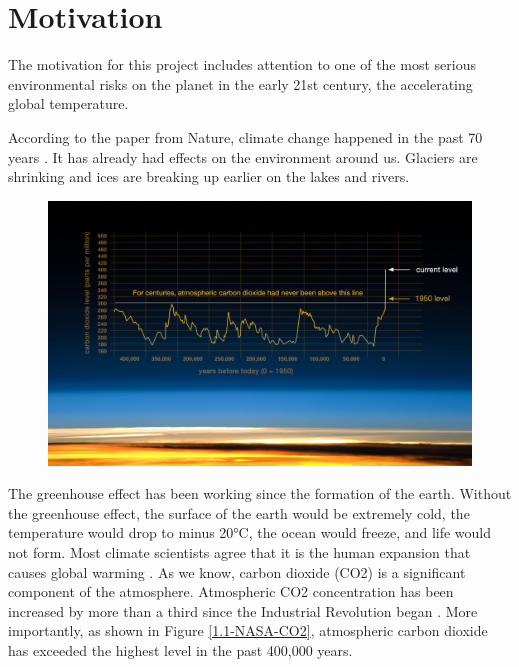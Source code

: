 \section{Motivation} %

The motivation for this project includes attention to one of the most serious environmental risks on the planet in the early 21st century, the accelerating global temperature.


According to the paper from Nature, climate change happened in the past 70 years \cite{parmesan2003globally}. It has already had effects on the environment around us. Glaciers are shrinking and ices are breaking up earlier on the lakes and rivers. 

\begin{figure}[!tbh]
\center
\includegraphics[scale=0.33]{Figure/1.1-NASA-CO2.jpeg}
\end{figure}

The greenhouse effect has been working since the formation of the earth. Without the greenhouse effect, the surface of the earth would be extremely cold, the temperature would drop to minus 20°C, the ocean would freeze, and life would not form. Most climate scientists agree that it is the human expansion that causes global warming \cite{epic337530}. As we know, carbon dioxide (CO2) is a significant component of the atmosphere. Atmospheric CO2 concentration has been increased by more than a third since the Industrial Revolution began \cite{epic337530}. More importantly, as shown in Figure \ref{1.1-NASA-CO2}, atmospheric carbon dioxide has exceeded the highest level in the past 400,000 years.

